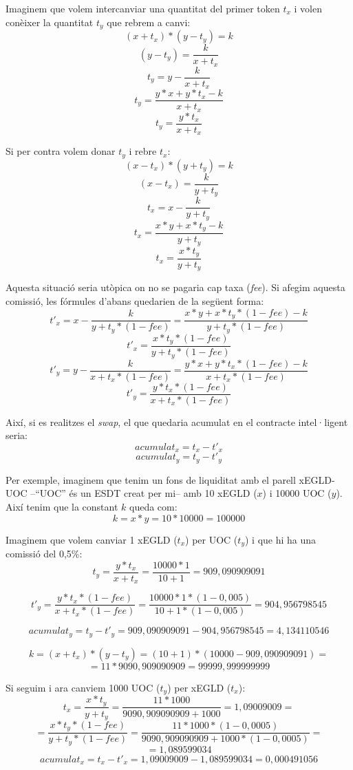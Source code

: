 \documentclass[11pt,a4paper]{article}
\begin{document}
Imaginem que volem intercanviar una quantitat del primer token \(t_x\) i volen conèixer la quantitat \(t_y\) que rebrem a canvi:
\[(x + t_x) * (y - t_y) = k\]
\[(y - t_y) = \frac{k}{x + t_x}\]
\[t_y = y - \frac{k}{x + t_x}\]
\[t_y = \frac{y * x + y * t_x - k}{x + t_x}\]
\[t_y = \frac{y * t_x}{x + t_x}\]

Si per contra volem donar \(t_y\) i rebre \(t_x\):
\[(x - t_x) * (y + t_y) = k\]
\[(x - t_x) = \frac{k}{y + t_y}\]
\[t_x = x - \frac{k}{y + t_y}\]
\[t_x = \frac{x * y + x * t_y - k}{y + t_y}\]
\[t_x = \frac{x * t_y}{y + t_y}\]

Aquesta situació seria utòpica on no se pagaria cap taxa (\textit{fee}). Si afegim aquesta comissió, les fórmules d'abans quedarien de la següent forma:
\[t'_x = x - \frac{k}{y + t_y * (1 - fee)} = \frac{x * y + x * t_y *(1 - fee) - k}{y + t_y * (1 - fee)}\]
\[t'_x = \frac{x * t_y *(1 - fee)}{y + t_y * (1 - fee)}\]
\[t'_y = y - \frac{k}{x + t_x * (1 - fee)} = \frac{y * x + y * t_x * (1 - fee) - k}{x + t_x * (1 - fee)}\]
\[t'_y = \frac{y * t_x * (1 - fee)}{x + t_x * (1 - fee)}\]

Així, si es realitzes el \textit{swap}, el que quedaria acumulat en el contracte intel·ligent seria:
\[acumulat_x = t_x - t'_x\]
\[acumulat_y = t_y - t'_y\]

Per exemple, imaginem que tenim un fons de liquiditat amb el parell xEGLD-UOC –``UOC'' és un ESDT creat per mi– amb 10 xEGLD (\(x\)) i 10000 UOC (\(y\)). Així tenim que la constant \(k\) queda com:
\[k = x * y = 10 * 10000 = 100000\]


Imaginem que volem canviar 1 xEGLD (\(t_x\)) per UOC (\(t_y\)) i que hi ha una comissió del 0,5\%:
\[t_y = \frac{y * t_x}{x + t_x} = \frac{10000 * 1}{10 + 1} = 909,090909091\]

\[t'_y = \frac{y * t_x * (1 - fee)}{x + t_x * (1 - fee)} = \frac{10000 * 1 * (1 - 0,005)}{10 + 1 * (1 - 0,005)} = 904,956798545\]

\[acumulat_y = t_y - t'_y = 909,090909091 - 904,956798545 = 4,134110546\]

\[k = (x + t_x) * (y - t_y) = (10 + 1) * (10000 - 909,090909091) =\]
\[= 11 * 9090,909090909 = 99999,999999999\]

Si seguim i ara canviem 1000 UOC (\(t_y\)) per xEGLD (\(t_x\)):
\[t_x = \frac{x * t_y}{y + t_y} = \frac{11 * 1000}{9090,909090909 + 1000} = 1,09009009 =\]
\[= \frac{x * t_y *(1 - fee)}{y + t_y * (1 - fee)} = \frac{11 * 1000 *(1 - 0,0005)}{9090,909090909 + 1000 * (1 - 0,0005)} =\]
\[= 1,089599034\]
\[acumulat_x = t_x - t'_x = 1,09009009 - 1,089599034 = 0,000491056\]
\end{document}
